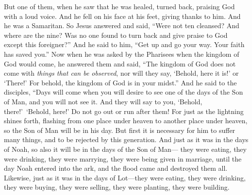 \begin{biblechapter}
\verse But one of them, when he saw that he was healed, turned back, praising God with a loud voice.
\verse And he fell on his face at his feet, giving thanks to him. And he was a Samaritan.
\verse So Jesus answered and said, “Were not ten cleansed? And where are the nine?
\verse Was no one found to turn back and give praise to God except this foreigner?”
\verse And he said to him, “Get up and go your way. Your faith has saved you.”
 Now when he was asked by the Pharisees when the kingdom of God would come, he answered them and said, “The kingdom of God does not come with \textit{things that can be observed},
\verse nor will they say, ‘Behold, here it is!’ or ‘There!’ For behold, the kingdom of God is in your midst.”
 And he said to the disciples, “Days will come when you will desire to see one of the days of the Son of Man, and you will not see it.
\verse And they will say to you, ‘Behold, there!’ ‘Behold, here!’ Do not go out or run after them!
\verse For just as the lightning shines forth, flashing from one place under heaven to another place under heaven, so the Son of Man will be in his day.
\verse But first it is necessary for him to suffer many things, and to be rejected by this generation.
\verse And just as it was in the days of Noah, so also it will be in the days of the Son of Man—
\verse they were eating, they were drinking, they were marrying, they were being given in marriage, until the day Noah entered into the ark, and the flood came and destroyed them all.
\verse Likewise, just as it was in the days of Lot—they were eating, they were drinking, they were buying, they were selling, they were planting, they were building.

\end{biblechapter}

